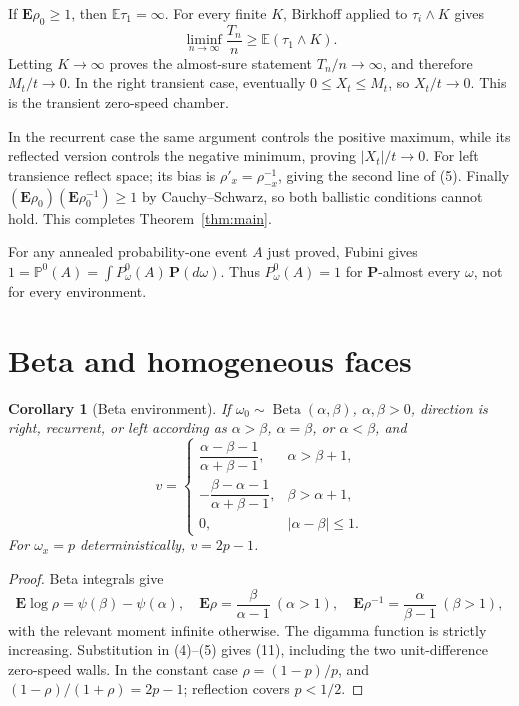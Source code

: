 \documentclass[10pt]{article}
\newtheorem{corollary}{Corollary}
\theoremstyle{remark}
\newcommand{\PP}{\mathbf P}
\newcommand{\EE}{\mathbf E}
\newcommand{\PA}{\mathbb P}
\begin{document}
If \(\EE\rho_0\geq1\), then \(\mathbb E\tau_1=\infty\).  For every finite
\(K\), Birkhoff applied to \(\tau_i\wedge K\) gives
\[
\liminf_{n\to\infty}\frac{T_n}{n}
\geq\mathbb E(\tau_1\wedge K).
\]
Letting \(K\to\infty\) proves the almost-sure statement
\(T_n/n\to\infty\), and therefore \(M_t/t\to0\).  In the right transient
case, eventually \(0\leq X_t\leq M_t\), so \(X_t/t\to0\).  This is the
transient zero-speed chamber.

In the recurrent case the same argument controls the positive maximum, while
its reflected version controls the negative minimum, proving
\(|X_t|/t\to0\).  For left transience reflect space; its bias is
\(\rho'_x=\rho_{-x}^{-1}\), giving the second line of (5).  Finally
\((\EE\rho_0)(\EE\rho_0^{-1})\geq1\) by Cauchy--Schwarz, so both ballistic
conditions cannot hold.  This completes Theorem~\ref{thm:main}.

For any annealed probability-one event \(A\) just proved, Fubini gives
\(1=\PA^0(A)=\int P_\omega^0(A)\,\PP(d\omega)\).  Thus
\(P_\omega^0(A)=1\) for \(\PP\)-almost every \(\omega\), not for every
environment.

\section{Beta and homogeneous faces}

\begin{corollary}[Beta environment]\label{cor:beta}
If \(\omega_0\sim\operatorname{Beta}(\alpha,\beta)\),
\(\alpha,\beta>0\), direction is right, recurrent, or left according as
\(\alpha>\beta\), \(\alpha=\beta\), or \(\alpha<\beta\), and
\[
v=\begin{cases}
\dfrac{\alpha-\beta-1}{\alpha+\beta-1},&\alpha>\beta+1,\\[5pt]
-\dfrac{\beta-\alpha-1}{\alpha+\beta-1},&\beta>\alpha+1,\\[5pt]
0,&|\alpha-\beta|\leq1.
\end{cases}                                                   \tag{11}
\]
For \(\omega_x=p\) deterministically, \(v=2p-1\).
\end{corollary}

\begin{proof}
Beta integrals give
\[
\EE\log\rho=\psi(\beta)-\psi(\alpha),\quad
\EE\rho=\frac{\beta}{\alpha-1}\ (\alpha>1),\quad
\EE\rho^{-1}=\frac{\alpha}{\beta-1}\ (\beta>1),            \tag{12}
\]
with the relevant moment infinite otherwise.  The digamma function is
strictly increasing.  Substitution in (4)--(5) gives (11), including the two
unit-difference zero-speed walls.  In the constant case
\(\rho=(1-p)/p\), and \((1-\rho)/(1+\rho)=2p-1\); reflection covers
\(p<1/2\).
\end{proof}
\fi
\end{document}

